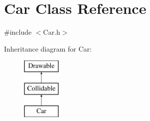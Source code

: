 \hypertarget{class_car}{}\section{Car Class Reference}
\label{class_car}


{\ttfamily \#include $<$Car.\+h$>$}

Inheritance diagram for Car\+:\begin{figure}[H]
\begin{center}
\leavevmode
\includegraphics[height=3.000000cm]{class_car}
\end{center}
\end{figure}
